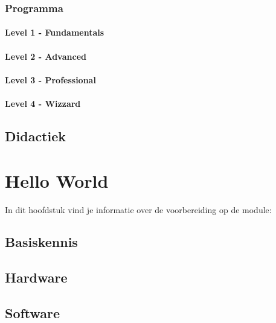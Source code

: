 \documentclass[]{book}
\begin{document}
\subsection{Programma}\label{programma}

\subsubsection{Level 1 - Fundamentals}\label{level-1---fundamentals}

\subsubsection{Level 2 - Advanced}\label{level-2---advanced}

\subsubsection{Level 3 - Professional}\label{level-3---professional}

\subsubsection{Level 4 - Wizzard}\label{level-4---wizzard}

\section{Didactiek}\label{didactiek}

\chapter{Hello World}\label{hello-world}

In dit hoofdstuk vind je informatie over de voorbereiding op de module:

\section{Basiskennis}\label{basiskennis}

\section{Hardware}\label{hardware}

\section{Software}\label{software}
\end{document}
